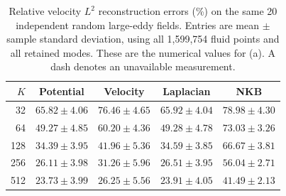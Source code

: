 \begin{table}[!htb]\centering\small
\caption{Relative velocity $L^2$ reconstruction errors (\%) on the same 20 independent random large-eddy fields. Entries are mean $\pm$ sample standard deviation, using all 1,599,754 fluid points and all retained modes. These are the numerical values for (a). A dash denotes an unavailable measurement.}
\label{tab:mainfour-NEW20-values}
\begin{tabular}{rcccc}\toprule
$K$&Potential&Velocity&Laplacian&NKB\\\midrule
32&$65.82\pm4.06$&$76.46\pm4.65$&$65.92\pm4.04$&$78.98\pm4.30$\\
64&$49.27\pm4.85$&$60.20\pm4.36$&$49.28\pm4.78$&$73.03\pm3.26$\\
128&$34.39\pm3.95$&$41.96\pm5.36$&$34.59\pm3.85$&$66.67\pm3.81$\\
256&$26.11\pm3.98$&$31.26\pm5.96$&$26.51\pm3.95$&$56.04\pm2.71$\\
512&$23.73\pm3.99$&$26.25\pm5.56$&$23.91\pm4.05$&$41.49\pm2.13$\\
\bottomrule\end{tabular}
\end{table}

